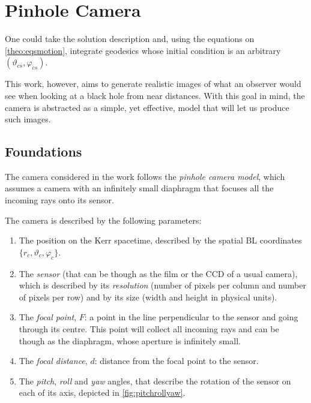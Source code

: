 \section{Pinhole Camera}
\label{sec:pinhole}

One could take the solution description and, using the equations on \autoref{theo:eqsmotion}, integrate geodesics whose initial condition is an arbitrary $(\vartheta_{cs}, \varphi_{cs})$.

This work, however, aims to generate realistic images of what an observer would see when looking at a black hole from near distances. With this goal in mind, the camera is abstracted as a simple, yet effective, model that will let us produce such images.

\subsection{Foundations}

The camera considered in the work follows the \emph{pinhole camera model}, which assumes a camera with an infinitely small diaphragm that focuses all the incoming rays onto its sensor.

The camera is described by the following parameters:
\begin{enumerate}
	\item The position on the Kerr spacetime, described by the spatial \ac{BL} coordinates $\{r_c, \vartheta_c, \varphi_c\}$.
	\item The \emph{sensor} (that can be though as the film or the CCD of a usual camera), which is described by its \emph{resolution} (number of pixels per column and number of pixels per row) and by its size (width and height in physical units).
	\item The \emph{focal point}, $F$: a point in the line perpendicular to the sensor and going through its centre. This point will collect all incoming rays and can be though as the diaphragm, whose aperture is infinitely small.
	\item The \emph{focal distance}, $d$: distance from the focal point to the sensor.
	\item The \emph{pitch}, \emph{roll} and \emph{yaw} angles, that describe the rotation of the sensor on each of its axis, depicted in \autoref{fig:pitchrollyaw}.
\end{enumerate}

